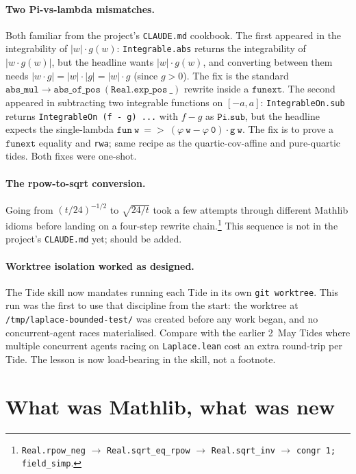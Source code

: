 \documentclass[11pt]{article}
\begin{document}
\paragraph{Two Pi-vs-lambda mismatches.} Both familiar from the project's
\texttt{CLAUDE.md} cookbook. The first appeared in the integrability of
$|w|\cdot g(w)$: \texttt{Integrable.abs} returns the integrability of
$|w \cdot g(w)|$, but the headline wants $|w| \cdot g(w)$, and converting
between them needs $|w \cdot g| = |w| \cdot |g| = |w| \cdot g$ (since
$g > 0$). The fix is the standard
$\mathtt{abs\_mul} \to \mathtt{abs\_of\_pos\ (Real.exp\_pos\ \_)}$ rewrite
inside a $\mathtt{funext}$. The second appeared in subtracting two
integrable functions on $[-a,a]$: \texttt{IntegrableOn.sub} returns
\texttt{IntegrableOn (f - g) ...} with $f - g$ as $\mathtt{Pi.sub}$, but
the headline expects the single-lambda
$\mathtt{fun\ w\ =>\ (\varphi\ w - \varphi\ 0)\cdot g\ w}$. The fix is to
prove a $\mathtt{funext}$ equality and \texttt{rwa}; same recipe as the
quartic-cov-affine and pure-quartic tides. Both fixes were one-shot.

\paragraph{The rpow-to-sqrt conversion.} Going from $(t/24)^{-1/2}$ to
$\sqrt{24/t}$ took a few attempts through different Mathlib idioms before
landing on a four-step rewrite chain.\footnote{\texttt{Real.rpow\_neg}
$\to$ \texttt{Real.sqrt\_eq\_rpow} $\to$ \texttt{Real.sqrt\_inv} $\to$
\texttt{congr 1; field\_simp}.} This sequence is not in the project's
\texttt{CLAUDE.md} yet; should be added.

\paragraph{Worktree isolation worked as designed.} The Tide skill now
mandates running each Tide in its own \texttt{git worktree}. This run was
the first to use that discipline from the start: the worktree at
\texttt{/tmp/laplace-bounded-test/} was created before any work began, and
no concurrent-agent races materialised. Compare with the earlier
2~May Tides where multiple concurrent agents racing on
\texttt{Laplace.lean} cost an extra round-trip per Tide. The lesson is now
load-bearing in the skill, not a footnote.

\section{What was Mathlib, what was new}
\end{document}
